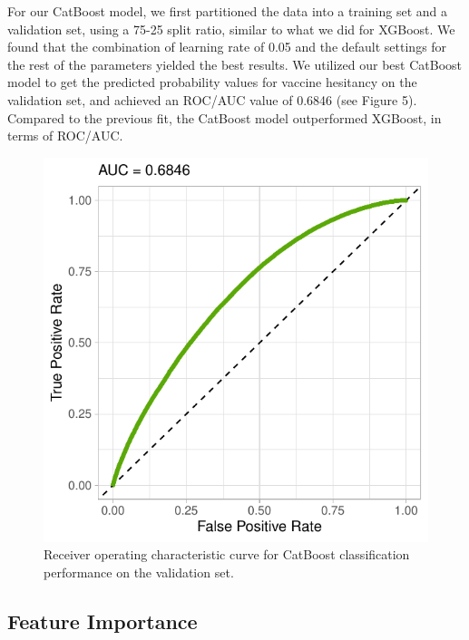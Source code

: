 \documentclass[
  12pt,
]{article}
\begin{document}
For our CatBoost model, we first partitioned the data into a training
set and a validation set, using a 75-25 split ratio, similar to what we
did for XGBoost. We found that the combination of learning rate of 0.05
and the default settings for the rest of the parameters yielded the best
results. We utilized our best CatBoost model to get the predicted
probability values for vaccine hesitancy on the validation set, and
achieved an ROC/AUC value of 0.6846 (see Figure 5). Compared to the
previous fit, the CatBoost model outperformed XGBoost, in terms of
ROC/AUC.

\begin{figure}[H]

{\centering \includegraphics{report_files/figure-latex/unnamed-chunk-7-1} 

}

\caption{Receiver operating characteristic curve for CatBoost classification performance on the validation set.}\label{fig:unnamed-chunk-7}
\end{figure}

\hypertarget{feature-importance}{%
\subsection{Feature Importance}\label{feature-importance}}
\end{document}

